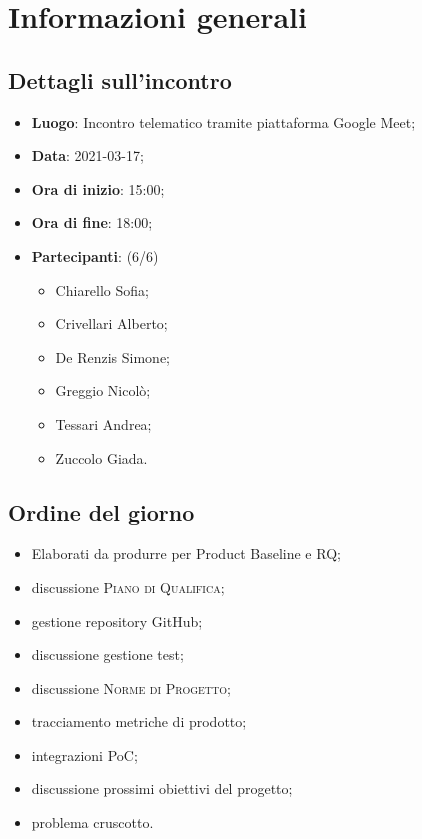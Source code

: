 \section{Informazioni generali}

\subsection{Dettagli sull'incontro}
\begin{itemize}
\item \textbf{Luogo}: Incontro telematico tramite piattaforma Google Meet;
\item \textbf{Data}: 2021-03-17;
\item \textbf{Ora di inizio}: 15:00;
\item \textbf{Ora di fine}: 18:00;
\item \textbf{Partecipanti}: (6/6)
\begin{itemize}
	\item Chiarello Sofia;
	\item Crivellari Alberto;
    \item De Renzis Simone;
    \item Greggio Nicolò;
    \item Tessari Andrea;
    \item Zuccolo Giada.
\end{itemize}
\end{itemize}

\subsection{Ordine del giorno}
\begin{itemize}
	\item Elaborati da produrre per Product Baseline e RQ;
	\item discussione \textsc{Piano di Qualifica};
	\item gestione repository GitHub;
	\item discussione gestione test;
	\item discussione \textsc{Norme di Progetto};
	\item tracciamento metriche di prodotto;
	\item integrazioni PoC;
	\item discussione prossimi obiettivi del progetto;
	\item problema cruscotto.
\end{itemize}


